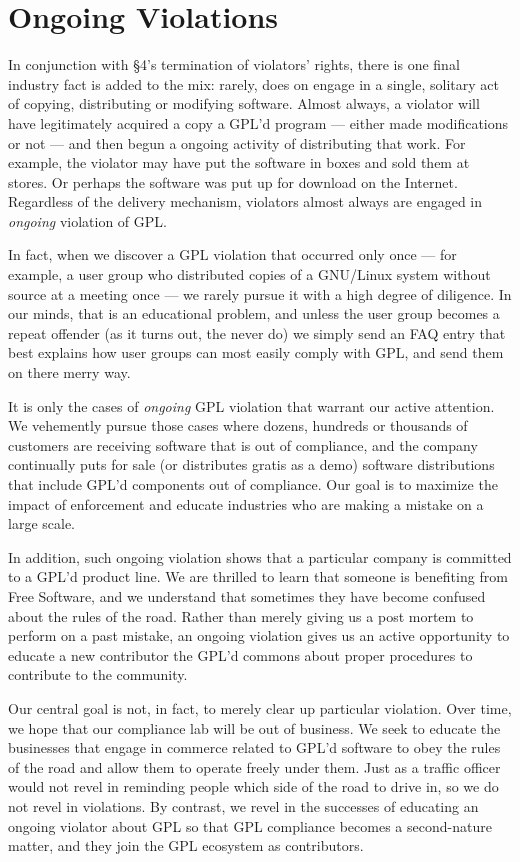 \documentclass[12pt]{report}
\begin{document}
\section{Ongoing Violations}

In conjunction with \S 4's termination of violators' rights, there is one
final industry fact is added to the mix: rarely, does on engage in a
single, solitary act of copying, distributing or modifying software.
Almost always, a violator will have legitimately acquired a copy a GPL'd
program --- either made modifications or not --- and then begun a ongoing
activity of distributing that work.  For example, the violator may have
put the software in boxes and sold them at stores.  Or perhaps the
software was put up for download on the Internet.  Regardless of the
delivery mechanism, violators almost always are engaged in {\em ongoing\/}
violation of GPL\@.

In fact, when we discover a GPL violation that occurred only once --- for
example, a user group who distributed copies of a GNU/Linux system without
source at a meeting once --- we rarely pursue it with a high degree of
diligence.  In our minds, that is an educational problem, and unless the
user group becomes a repeat offender (as it turns out, the never do) we
simply send an FAQ entry that best explains how user groups can most
easily comply with GPL, and send them on there merry way.

It is only the cases of {\em ongoing\/} GPL violation that warrant our
active attention.  We vehemently pursue those cases where dozens, hundreds
or thousands of customers are receiving software that is out of
compliance, and the company continually puts for sale (or distributes
gratis as a demo) software distributions that include GPL'd components out
of compliance.  Our goal is to maximize the impact of enforcement and
educate industries who are making a mistake on a large scale.

In addition, such ongoing violation shows that a particular company is
committed to a GPL'd product line.  We are thrilled to learn that someone
is benefiting from Free Software, and we understand that sometimes they
have become confused about the rules of the road.  Rather than merely
giving us a post mortem to perform on a past mistake, an ongoing violation
gives us an active opportunity to educate a new contributor the GPL'd
commons about proper procedures to contribute to the community.

Our central goal is not, in fact, to merely clear up particular violation.
Over time, we hope that our compliance lab will be out of business.  We
seek to educate the businesses that engage in commerce related to GPL'd
software to obey the rules of the road and allow them to operate freely
under them.  Just as a traffic officer would not revel in reminding people
which side of the road to drive in, so we do not revel in violations.  By
contrast, we revel in the successes of educating an ongoing violator about
GPL so that GPL compliance becomes a second-nature matter, and they join
the GPL ecosystem as contributors.
\end{document}
